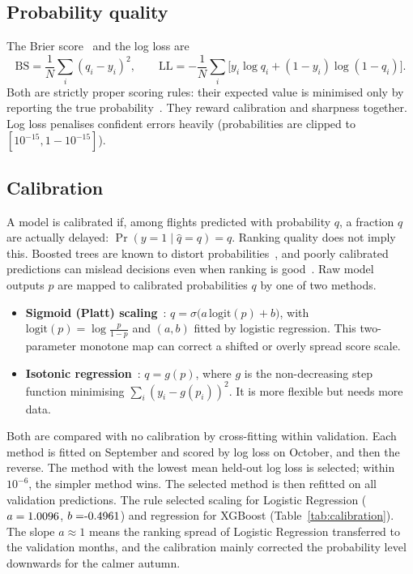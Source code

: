 \documentclass[conference]{IEEEtran}
\begin{document}
\subsection{Probability quality}
The Brier score~\cite{brier1950} and the log loss are
\begin{equation}
\mathrm{BS}=\frac{1}{N}\sum_{i}(q_i-y_i)^2,\qquad
\mathrm{LL}=-\frac{1}{N}\sum_{i}\big[y_i\log q_i+(1-y_i)\log(1-q_i)\big].
\end{equation}
Both are strictly proper scoring rules: their expected value is minimised only by reporting the true
probability~\cite{gneiting2007}. They reward calibration and sharpness together. Log loss penalises
confident errors heavily (probabilities are clipped to $[10^{-15},1-10^{-15}]$).

\subsection{Calibration}
A model is calibrated if, among flights predicted with probability $q$, a fraction $q$ are actually
delayed: $\Pr(y=1\mid \hat{q}=q)=q$. Ranking quality does not imply this. Boosted trees are known to
distort probabilities~\cite{niculescumizil2005}, and poorly calibrated predictions can mislead
decisions even when ranking is good~\cite{guo2017,vancalster2019}. Raw model outputs $p$ are mapped
to calibrated probabilities $q$ by one of two methods.
\begin{itemize}
\item \textbf{Sigmoid (Platt) scaling}~\cite{platt2000}: $q=\sigma\big(a\,\mathrm{logit}(p)+b\big)$,
with $\mathrm{logit}(p)=\log\frac{p}{1-p}$ and $(a,b)$ fitted by logistic regression. This
two-parameter monotone map can correct a shifted or overly spread score scale.
\item \textbf{Isotonic regression}~\cite{zadrozny2002}: $q=g(p)$, where $g$ is the non-decreasing
step function minimising $\sum_i(y_i-g(p_i))^2$. It is more flexible but needs more data.
\end{itemize}
Both are compared with no calibration by cross-fitting within validation. Each method is fitted on
September and scored by log loss on October, and then the reverse. The method with the lowest mean
held-out log loss is selected; within $10^{-6}$, the simpler method wins. The selected method is
then refitted on all validation predictions. The rule selected \CalSelLR{} scaling for Logistic
Regression ($a=1.0096$, $b=\CalInterceptB$) and \CalSelXGB{} regression for XGBoost
(Table~\ref{tab:calibration}). The slope $a\approx 1$ means the ranking spread of Logistic
Regression transferred to the validation months, and the calibration mainly corrected the
probability level downwards for the calmer autumn.

\end{document}
